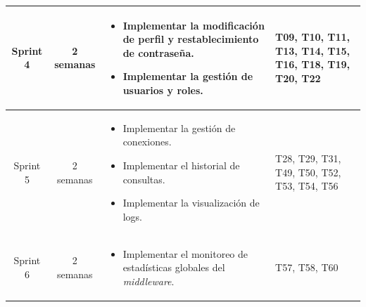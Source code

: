 \begin{longtable}[c]{|c|c|m{}|m{}|}
    \hline
    Sprint 4 & 2 semanas & \begin{itemize}[nosep, leftmargin=0.7cm, before=\vspace{0.5em}, after=\vspace{0.5em}]
        \item Implementar la modificación de perfil y restablecimiento de contraseña.
        \item Implementar la gestión de usuarios y roles.
    \end{itemize} & T09, T10, T11, T13, T14, T15, T16, T18, T19, T20, T22 \\
    \hline
    Sprint 5 & 2 semanas & \begin{itemize}[nosep, leftmargin=0.7cm, before=\vspace{0.5em}, after=\vspace{0.5em}]
        \item Implementar la gestión de conexiones.
        \item Implementar el historial de consultas.
        \item Implementar la visualización de logs.
    \end{itemize} & T28, T29, T31, T49, T50, T52, T53, T54, T56 \\
    \hline
    Sprint 6 & 2 semanas & \begin{itemize}[nosep, leftmargin=0.7cm, before=\vspace{0.5em}, after=\vspace{0.5em}]
        \item Implementar el monitoreo de estadísticas globales del \textit{middleware}.
    \end{itemize} & T57, T58, T60 \\
    \hline  
\end{longtable}
